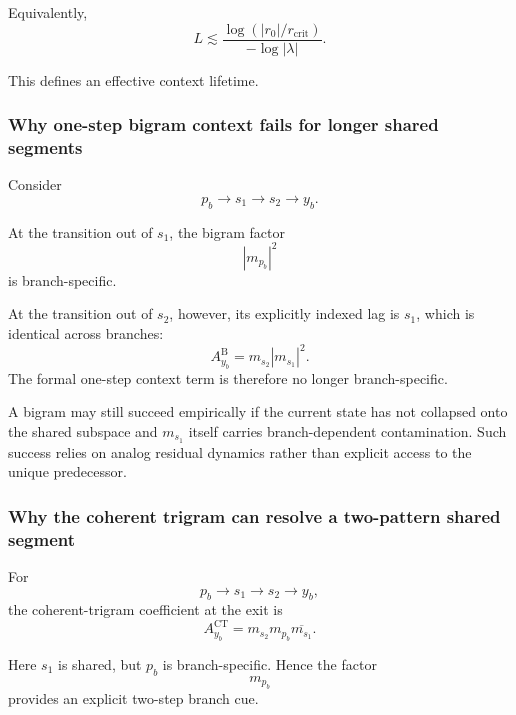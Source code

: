 Equivalently,
\begin{equation}
L
\lesssim
\frac{
\log(|r_0|/r_{\mathrm{crit}})
}{
-\log|\lambda|
}.
\label{eq:max-shared-length}
\end{equation}

This defines an effective context lifetime.

\subsubsection{Why one-step bigram context fails for longer shared segments}

Consider
\begin{equation}
p_b
\rightarrow
s_1
\rightarrow
s_2
\rightarrow
y_b.
\end{equation}

At the transition out of $s_1$, the bigram factor
\begin{equation}
|m_{p_b}|^2
\end{equation}
is branch-specific.

At the transition out of $s_2$, however, its explicitly indexed lag is
$s_1$, which is identical across branches:
\begin{equation}
A_{y_b}^{\mathrm{B}}
=
m_{s_2}|m_{s_1}|^2.
\end{equation}
The formal one-step context term is therefore no longer branch-specific.

A bigram may still succeed empirically if the current state has not collapsed
onto the shared subspace and $m_{s_1}$ itself carries branch-dependent
contamination.  Such success relies on analog residual dynamics rather than
explicit access to the unique predecessor.

\subsubsection{Why the coherent trigram can resolve a two-pattern shared segment}

For
\begin{equation}
p_b
\rightarrow
s_1
\rightarrow
s_2
\rightarrow
y_b,
\end{equation}
the coherent-trigram coefficient at the exit is
\begin{equation}
A_{y_b}^{\mathrm{CT}}
=
m_{s_2}
m_{p_b}
\overline{m_{s_1}}.
\label{eq:ct-shared-two}
\end{equation}

Here $s_1$ is shared, but $p_b$ is branch-specific.  Hence the factor
\begin{equation}
m_{p_b}
\end{equation}
provides an explicit two-step branch cue.

